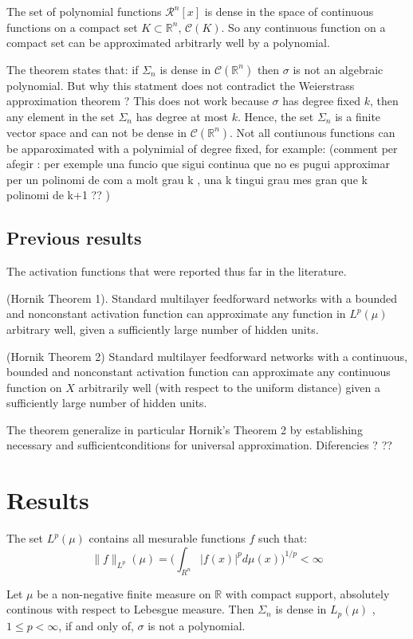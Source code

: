 \documentclass[../main.tex]{subfiles}
\begin{document}
\begin{corolari}
	The set of polynomial functions $\mathcal{R}^n[x]$ is dense in the space of continuous functions on a compact set $K \subset \mathbb{R}^n$, $\mathcal{C}(K)$. So any continuous function on a compact set can be approximated arbitrarly well by a polynomial. 
\end{corolari}

\noindent The theorem states that: if $\Sigma_n$ is dense in $\mathcal{C}(\mathbb{R}^n)$ then $\sigma$ is not an algebraic polynomial. But why this statment does not contradict the Weierstrass approximation theorem ?
This does not work because $\sigma$ has degree fixed $k$, then any element in the set $\Sigma_n$ has degree at most $k$. Hence, the set $\Sigma_n$ is a finite vector space and can not be dense in $\mathcal{C}(\mathbb{R}^n)$. Not all contiunous functions can be apparoximated with a polynimial of degree fixed, for example: 
(comment per afegir : per exemple una funcio que sigui continua que no es pugui approximar per un polinomi de com a molt grau k , una k tingui grau mes gran que k polinomi de k+1 ?? )

\subsection{Previous results}
 The activation functions that were reported thus far in the literature. 
\begin{theorem} (Hornik Theorem 1). Standard multilayer feedforward networks with a bounded and nonconstant activation function can approximate any function in $L^p(\mu)$ arbitrary well, given a sufficiently large number of hidden units. 
\end{theorem}

\begin{theorem} (Hornik Theorem 2)  Standard multilayer feedforward networks with a continuous, bounded and nonconstant activation function can approximate any continuous function on $X$ arbitrarily well (with respect to the uniform distance) given a sufficiently large number of hidden units. 
\end{theorem}
The theorem generalize in particular Hornik's Theorem 2 by establishing necessary and sufficientconditions for universal approximation.
Diferencies ? ?? 
\section{Results}


\begin{definition} The set $L^{p}(\mu)$ contains all mesurable functions $f$ such that: 
	$$ \|f\|_{L^p}(\mu) = \Big( \int_{R^n} |f(x)|^p d\mu(x)\Big)^{1/p} < \infty $$

\end{definition}

\begin{propo}
Let $\mu $ be a non-negative finite measure on $\mathbb{R}$ with compact support, absolutely continous with respect to Lebesgue measure. Then $\Sigma_n$ is dense in $L_p(\mu)$ , $1\leq p < \infty$, if and only of, $\sigma$ is not a polynomial.
\end{propo}
\end{document}
